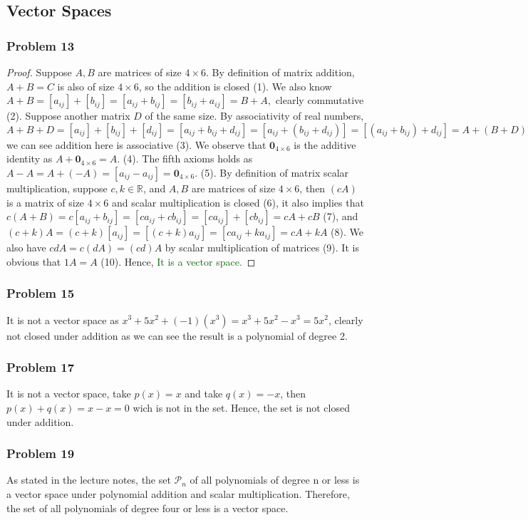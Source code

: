 \documentclass[a4paper,12pt]{article}
\begin{document}
\subsection{Vector Spaces}
\subsubsection*{Problem 13}
\begin{proof}
 Suppose $A,B$ are matrices of size $4 \times 6$. By definition of matrix addition, $A+B=C$ is also of size $4\times 6$, so the addition is closed (1). We also know $A+B=[a_{ij}]+[b_{ij}]=[a_{ij}+b_{ij}]=[b_{ij}+a_{ij}]=B+A,$ clearly commutative (2). Suppose another matrix $D$ of the same size. By associativity of real numbers, $A+B+D=[a_{ij}]+[b_{ij}]+[d_{ij}]=[a_{ij}+b_{ij}+d_{ij}]=[a_{ij}+(b_{ij}+d_{ij})]=[(a_{ij}+b_{ij})+d_{ij}]=A+(B+D)=(A+B)+D,$ we can see addition here is associative (3). We observe that $\textbf{0}_{4\times 6}$ is the additive identity as $A+\textbf{0}_{4\times 6}=A$. (4). The fifth axioms holds as $A-A=A+(-A)=[a_{ij}-a_{ij}]=\textbf{0}_{4\times 6}.$ (5). By definition of matrix scalar multiplication, suppose $c,k \in \mathbb{R}$, and $A,B$ are matrices of size $4 \times 6$, then $(cA)$ is a matrix of size $4 \times 6$ and scalar multiplication is closed (6), it also implies that $c(A+B)=c[a_{ij}+b_{ij}]=[ca_{ij}+cb_{ij}]=[ca_{ij}]+[cb_{ij}]=cA+cB$ (7), and $(c+k)A=(c+k)[a_{ij}]=[(c+k)a_{ij}]=[ca_{ij}+ka_{ij}]=cA+kA$ (8). We also have $cdA=c(dA)=(cd)A$ by scalar multiplication of matrices (9). It is obvious that $1A=A$ (10). Hence, \textcolor{darkgreen}{It is a vector space.}   
\end{proof}
\subsubsection*{Problem 15}
It is not a vector space as $x^3+5x^2+(-1)(x^3)=x^3+5x^2-x^3=5x^2$, clearly not closed under addition as we can see the result is a polynomial of degree 2.
\subsubsection*{Problem 17}
It is not a vector space, take $p(x)=x$ and take $q(x)=-x$, then $p(x)+q(x)=x-x=0$ wich is not in the set. Hence, the set is not closed under addition.
\subsubsection*{Problem 19}
As stated in the lecture notes, the set $\mathcal{P}_n$ of all polynomials of degree n or less is a vector space under polynomial addition and scalar multiplication. Therefore, the set of all polynomials of degree four or less is a vector space.
\end{document}
